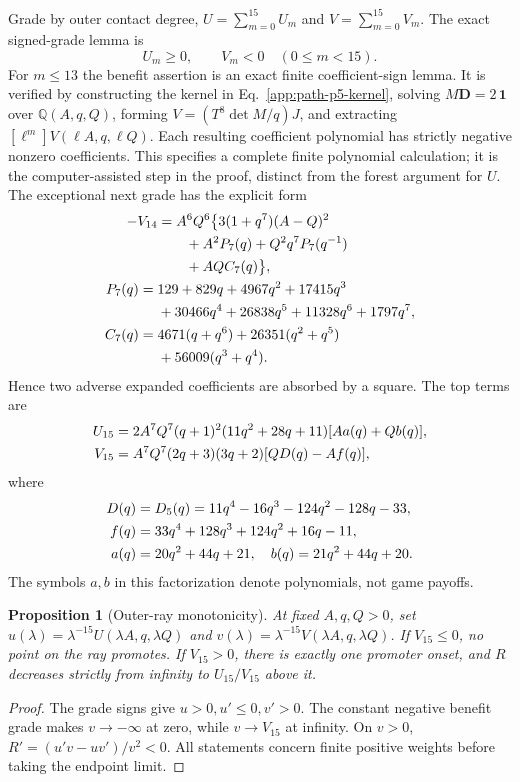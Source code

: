 \documentclass[aps,pre,reprint,amsmath,amssymb,longbibliography]{revtex4-2}
\newtheorem{proposition}[theorem]{Proposition}
\begin{document}
Grade by outer contact degree, $U=\sum_{m=0}^{15}U_m$ and
$V=\sum_{m=0}^{15}V_m$. The exact signed-grade lemma is
\begin{equation}\label{v4:eq:p5-sign-lemma}
 U_m\ge0,\qquad V_m<0\quad(0\le m<15).
\end{equation}
For $m\le13$ the benefit assertion is an exact finite coefficient-sign
lemma. It is verified by constructing the kernel in
Eq.~\eqref{app:path-p5-kernel}, solving $M\mathbf D=2\,\mathbf1$ over
$\mathbb Q(A,q,Q)$, forming $V=(T^8\det M/q)J$, and extracting
$[\ell^m]V(\ell A,q,\ell Q)$. Each resulting coefficient polynomial
has strictly negative nonzero coefficients. This specifies a complete
finite polynomial calculation; it is the computer-assisted step in the
proof, distinct from the forest argument for $U$.
The exceptional next grade has the explicit form
\begin{align}
 -V_{14}&=A^6Q^6\bigl\{3(1+q^7)(A-Q)^2\notag \\
 &\qquad+A^2P_7(q)+Q^2q^7P_7(q^{-1})\notag \\
 &\qquad+AQ C_7(q)\bigr\}, \notag\\
 P_7(q)={}&129+829q+4967q^2+17415q^3 \\
 &+30466q^4+26838q^5+11328q^6+1797q^7, \notag \\
 C_7(q)={}&4671(q+q^6)+26351(q^2+q^5)\notag\\
 &+56009(q^3+q^4). \notag 
\end{align}
Hence two adverse expanded coefficients are absorbed by a square. The
top terms are
\begin{align}
 U_{15}&=2A^7Q^7(q+1)^2(11q^2+28q+11)[Aa(q)+Qb(q)], \notag \\
 V_{15}&=A^7Q^7(2q+3)(3q+2)[QD(q)-Af(q)],
\end{align}
where
\begin{align}
 D(q)&=D_5(q)=11q^4-16q^3-124q^2-128q-33, \notag \\
 f(q)&=33q^4+128q^3+124q^2+16q-11,\\
 a(q)&=20q^2+44q+21,\quad b(q)=21q^2+44q+20. \notag
\end{align}
The symbols $a,b$ in this factorization denote polynomials, not game payoffs.

\begin{proposition}[Outer-ray monotonicity]\label{v4:prop:p5-ray}
At fixed $A,q,Q>0$, set
$u(\lambda)=\lambda^{-15}U(\lambda A,q,\lambda Q)$ and
$v(\lambda)=\lambda^{-15}V(\lambda A,q,\lambda Q)$.
If $V_{15}\le0$, no point on the ray promotes. If $V_{15}>0$, there is
exactly one promoter onset, and $R$ decreases strictly from infinity
to $U_{15}/V_{15}$ above it.
\end{proposition}
\begin{proof}
The grade signs give $u>0,u'\le0,v'>0$. The constant negative benefit
grade makes $v\to-\infty$ at zero, while $v\to V_{15}$ at infinity.
On $v>0$, $R'=(u'v-uv')/v^2<0$. All statements concern finite positive
weights before taking the endpoint limit.
\end{proof}
\end{document}
